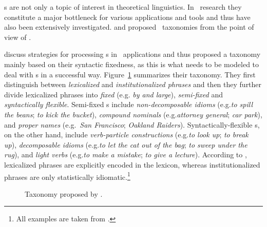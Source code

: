 \documentclass[output=paper]{langsci/langscibook}
\begin{document}
\mwe s are not only a topic of interest in theoretical linguistics. 
In \nlp\ research they constitute a major bottleneck for various applications and tools and thus have also been extensively investigated.
\citet{Sag:2002} and \citet{Baldwin2010} proposed \mwe\ taxonomies from the point of view of \nlp. 

\citet{Sag:2002} discuss strategies for processing \mwe s in \nlp\ applications and thus proposed a taxonomy mainly based on their syntactic fixedness, as this is what needs to be modeled to deal with \mwe s in a successful way.
Figure~\ref{fig:Sag_taxonomy} summarizes their taxonomy.
They first distinguish between \textit{lexicalized} and \textit{institutionalized phrases} and then they further divide lexicalized phrases into \textit{fixed} (e.g. \textit{by and large}), \textit{semi-fixed} and \textit{syntactically flexible}. 
Semi-fixed \mwe s include \textit{non-decomposable idioms} 
(e.g.\@ \textit{to spill the beans}; \textit{to kick the bucket}), \textit{compound nominals} 
(e.g.\@ \textit{attorney general}; \textit{car park}), and  \textit{proper names} (e.g.~\textit{San Francisco}; \textit{Oakland Raiders}).
Syntactically-flexible \mwe s, on the other hand, include \textit{verb-particle constructions} (e.g.\@ \textit{to look up}; \textit{to break up}), \textit{decomposable idioms} (e.g.\@ \textit{to let the cat out of the bag}; \textit{to sweep under the rug}), and \textit{light verbs} (e.g.\@ \textit{to make a mistake}; \textit{to give a lecture}). 
According to \citet{Sag:2002}, lexicalized phrases are explicitly encoded in the lexicon, whereas institutionalized phrases are only statistically idiomatic.\footnote{All examples are taken from \citet{Sag:2002}.} 

\begin{figure}[h]
    
\caption{Taxonomy proposed by \citet{Sag:2002}.}
\label{fig:Sag_taxonomy}
\end{figure}
\end{document}
